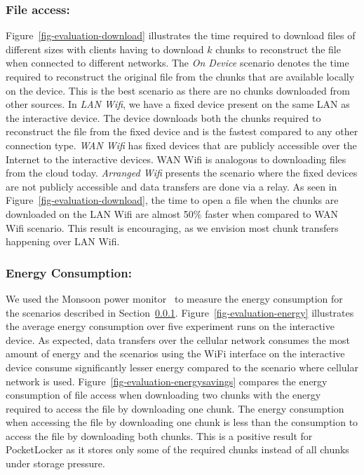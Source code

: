 \subsubsection{File access:\space} \label{sec-fileaccess}
Figure~\ref{fig-evaluation-download} illustrates the time required to download
files of different sizes with clients having to download $k$ chunks to
reconstruct the file when connected to different networks. The \textit{On
Device} scenario denotes the time required to reconstruct the original file
from the chunks that are available locally on the device. This is the best
scenario as there are no chunks downloaded from other sources. In \textit{LAN
  Wifi}, we
have a fixed device present on the same LAN as the interactive device. The
device downloads both the chunks required to reconstruct the file from the fixed
device and is the fastest compared
to any other connection type. \textit{WAN Wifi} has fixed devices that are
publicly accessible over the Internet to the interactive devices. WAN Wifi is
analogous to downloading files from the cloud today. \textit{Arranged Wifi}
presents the scenario where the fixed devices are not publicly accessible and
data transfers are done via a relay. As seen in
Figure~\ref{fig-evaluation-download}, the time to open a file when the
chunks are downloaded on the LAN Wifi are almost 50\% faster when compared to
WAN Wifi scenario. This result is encouraging, as we envision most chunk
transfers happening over LAN Wifi.

\subsubsection{Energy Consumption:\space}We used the Monsoon power
monitor~\cite{monsoon} to measure the energy consumption
for the scenarios described in Section~\ref{sec-fileaccess}.
Figure~\ref{fig-evaluation-energy} illustrates the average energy consumption
over five experiment runs on the
interactive device. As expected, data transfers over the cellular network
consumes the most amount of energy and the scenarios using the WiFi interface on
the interactive device consume significantly lesser energy compared to the
scenario where cellular network is used. Figure~\ref{fig-evaluation-energysavings}
compares the energy consumption of file access when downloading two chunks
with the energy required to access the file by downloading one chunk. The
energy consumption when accessing the file by downloading one
chunk is less than the consumption to access the file by downloading both
chunks. This is a positive result for PocketLocker as it stores only some of
the required chunks instead of all chunks under storage pressure.

